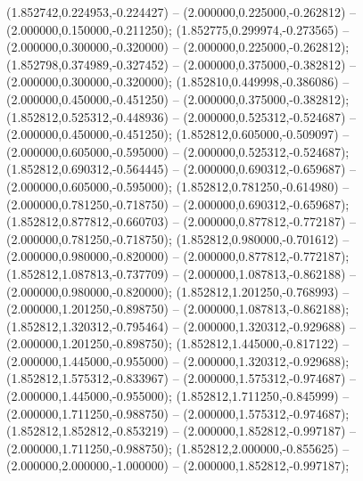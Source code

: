  (1.852742,0.224953,-0.224427) -- (2.000000,0.225000,-0.262812) -- (2.000000,0.150000,-0.211250);
 (1.852775,0.299974,-0.273565) -- (2.000000,0.300000,-0.320000) -- (2.000000,0.225000,-0.262812);
 (1.852798,0.374989,-0.327452) -- (2.000000,0.375000,-0.382812) -- (2.000000,0.300000,-0.320000);
 (1.852810,0.449998,-0.386086) -- (2.000000,0.450000,-0.451250) -- (2.000000,0.375000,-0.382812);
 (1.852812,0.525312,-0.448936) -- (2.000000,0.525312,-0.524687) -- (2.000000,0.450000,-0.451250);
 (1.852812,0.605000,-0.509097) -- (2.000000,0.605000,-0.595000) -- (2.000000,0.525312,-0.524687);
 (1.852812,0.690312,-0.564445) -- (2.000000,0.690312,-0.659687) -- (2.000000,0.605000,-0.595000);
 (1.852812,0.781250,-0.614980) -- (2.000000,0.781250,-0.718750) -- (2.000000,0.690312,-0.659687);
 (1.852812,0.877812,-0.660703) -- (2.000000,0.877812,-0.772187) -- (2.000000,0.781250,-0.718750);
 (1.852812,0.980000,-0.701612) -- (2.000000,0.980000,-0.820000) -- (2.000000,0.877812,-0.772187);
 (1.852812,1.087813,-0.737709) -- (2.000000,1.087813,-0.862188) -- (2.000000,0.980000,-0.820000);
 (1.852812,1.201250,-0.768993) -- (2.000000,1.201250,-0.898750) -- (2.000000,1.087813,-0.862188);
 (1.852812,1.320312,-0.795464) -- (2.000000,1.320312,-0.929688) -- (2.000000,1.201250,-0.898750);
 (1.852812,1.445000,-0.817122) -- (2.000000,1.445000,-0.955000) -- (2.000000,1.320312,-0.929688);
 (1.852812,1.575312,-0.833967) -- (2.000000,1.575312,-0.974687) -- (2.000000,1.445000,-0.955000);
 (1.852812,1.711250,-0.845999) -- (2.000000,1.711250,-0.988750) -- (2.000000,1.575312,-0.974687);
 (1.852812,1.852812,-0.853219) -- (2.000000,1.852812,-0.997187) -- (2.000000,1.711250,-0.988750);
 (1.852812,2.000000,-0.855625) -- (2.000000,2.000000,-1.000000) -- (2.000000,1.852812,-0.997187);
